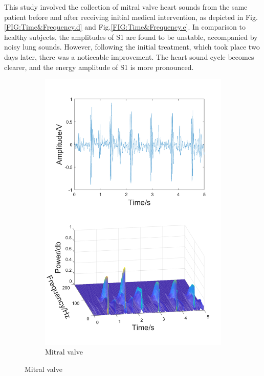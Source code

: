 This study involved the collection of mitral valve heart sounds from the same patient before and after receiving initial medical intervention, as depicted in Fig. \ref{FIG:Time&Frequency.d} and Fig.\ref{FIG:Time&Frequency.e}. In comparison to healthy subjects, the amplitudes of S1 are found to be unstable, accompanied by noisy lung sounds. However, following the initial treatment, which took place two days later, there was a noticeable improvement. The heart sound cycle becomes clearer, and the energy amplitude of S1 is more pronounced.
\begin{figure}[htbp]
\centering
    \begin{subfigure}{.3\linewidth}
        \centering
        \includegraphics[width=1\linewidth]{figs/disscussion/a.png}
        \caption{Mitral valve}

\end{subfigure}
\end{figure}
